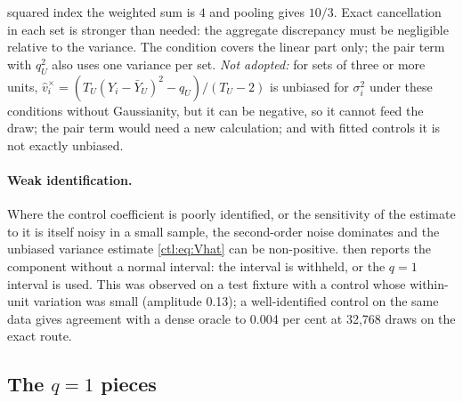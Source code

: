 \begin{enumerate}
squared index the weighted sum is $4$ and pooling gives $10/3$. Exact cancellation in each set is stronger than
needed: the aggregate discrepancy must be negligible relative to the variance. The condition covers the linear
part only; the pair term with $q_U^2$ also uses one variance per set. \emph{Not adopted:} for sets of three or more
units, $\hat v_i^\times=(T_U(Y_i-\bar Y_U)^2-q_U)/(T_U-2)$ is unbiased for $\sigma_i^2$ under these conditions without
Gaussianity, but it can be negative, so it cannot feed the draw; the pair term would need a new calculation; and
with fitted controls it is not exactly unbiased.
\end{enumerate}

\paragraph{Weak identification.} Where the control coefficient is poorly identified, or the sensitivity of the
estimate to it is itself noisy in a small sample, the second-order noise dominates and the unbiased variance
estimate \eqref{ctl:eq:Vhat} can be non-positive. \fevc{} then reports the component without a normal interval: the
interval is withheld, or the $q=1$ interval is used. This was observed on a test fixture with a control whose
within-unit variation was small (amplitude 0.13); a well-identified control on the same data gives agreement with
a dense oracle to 0.004 per cent at 32{,}768 draws on the exact route.

\subsection{The $q=1$ pieces}\label{ctl:q1}

